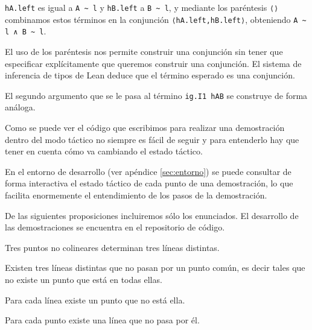 \begin{enumerate}[label=L.\arabic*, topsep=0mm]
	      \lstinline{hA.left} es igual a \lstinline{A ~ l} y \lstinline{hB.left} a
	      \lstinline{B ~ l}, y mediante los paréntesis \lstinline{⟨⟩} combinamos
	      estos términos en la conjunción \lstinline{⟨hA.left,hB.left⟩}, obteniendo
	      \lstinline{A ~ l ∧ B ~ l}.

	      El uso de los paréntesis nos permite construir una conjunción sin
	      tener que especificar explícitamente que queremos construir una
	      conjunción. El sistema de inferencia de tipos de Lean deduce que el
	      término esperado es una conjunción.

	      El segundo argumento que se le pasa al término \lstinline{ig.I1 hAB}
	      se construye de forma análoga.

\end{enumerate}

Como se puede ver el código que escribimos para realizar una demostración dentro
del modo táctico no siempre es fácil de seguir y para entenderlo hay que tener
en cuenta cómo va cambiando el estado táctico.

En el entorno de desarrollo (ver apéndice \ref{sec:entorno}) se puede consultar
de forma interactiva el estado táctico de cada punto de una demostración, lo que
facilita enormemente el entendimiento de los pasos de la demostración.

De las siguientes proposiciones incluiremos sólo los enunciados. El desarrollo
de las demostraciones se encuentra en el repositorio de código.

\begin{prop} Tres puntos no colineares determinan tres líneas distintas.
\end{prop}



\begin{prop}
	Existen tres líneas distintas que no pasan por un punto común, es decir
	tales que no existe un punto que está en todas ellas.
\end{prop}


\begin{prop}
	Para cada línea existe un punto que no está ella.
\end{prop}


\begin{prop}
	Para cada punto existe una línea que no pasa por él.
\end{prop}



























